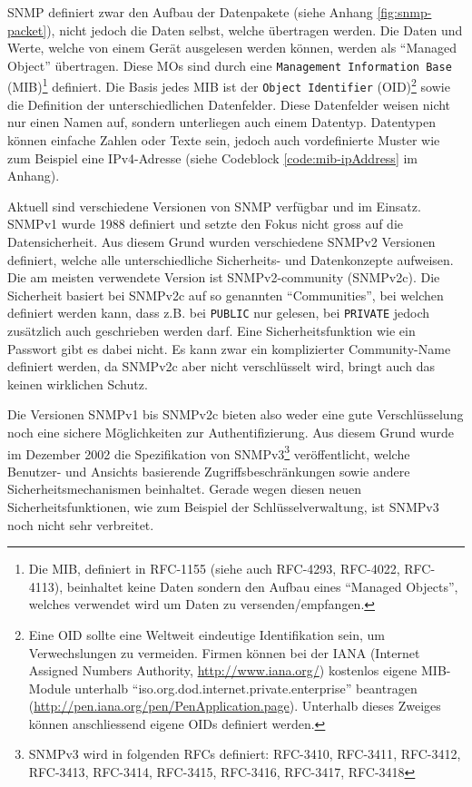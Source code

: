 SNMP definiert zwar den Aufbau der Datenpakete (siehe Anhang \ref{fig:snmp-packet}), nicht jedoch die Daten selbst, welche \"ubertragen werden. Die Daten und Werte, welche von einem Ger\"at ausgelesen werden k\"onnen, werden als "`Managed Object"' \"ubertragen. Diese MOs sind durch eine \texttt{Management Information Base} (MIB)\footnote{\label{foot:snmp-mib}Die MIB, definiert in RFC-1155\cite{rfc1155} (siehe auch RFC-4293\cite{rfc4293}, RFC-4022\cite{rfc4022}, RFC-4113\cite{rfc4113}), beinhaltet keine Daten sondern den Aufbau eines "`Managed Objects"', welches verwendet wird um Daten zu versenden/empfangen.} definiert. Die Basis jedes MIB ist der \texttt{Object Identifier} (OID)\footnote{\label{foot:snmp-oid}Eine OID sollte eine Weltweit eindeutige Identifikation sein, um Verwechslungen zu vermeiden. Firmen k\"onnen bei der IANA (Internet Assigned Numbers Authority, \url{http://www.iana.org/}) kostenlos eigene MIB-Module unterhalb "`iso.org.dod.internet.private.enterprise"' beantragen (\url{http://pen.iana.org/pen/PenApplication.page}). Unterhalb dieses Zweiges k\"onnen anschliessend eigene OIDs definiert werden.} sowie die Definition der unterschiedlichen Datenfelder. Diese Datenfelder weisen nicht nur einen Namen auf, sondern unterliegen auch einem Datentyp. Datentypen k\"onnen einfache Zahlen oder Texte sein, jedoch auch vordefinierte Muster wie zum Beispiel eine IPv4-Adresse (siehe Codeblock \ref{code:mib-ipAddress} im Anhang).

Aktuell sind verschiedene Versionen von SNMP verf\"ugbar und im Einsatz. SNMPv1 wurde 1988 definiert und setzte den Fokus nicht gross auf die Datensicherheit. Aus diesem Grund wurden verschiedene SNMPv2 Versionen definiert, welche alle unterschiedliche Sicherheits- und Datenkonzepte aufweisen. Die am meisten verwendete Version ist SNMPv2-community (SNMPv2c). Die Sicherheit basiert bei SNMPv2c auf so genannten "`Communities"', bei welchen definiert werden kann, dass z.B. bei \texttt{PUBLIC} nur gelesen, bei \texttt{PRIVATE} jedoch zus\"atzlich auch geschrieben werden darf. Eine Sicherheitsfunktion wie ein Passwort gibt es dabei nicht. Es kann zwar ein komplizierter Community-Name definiert werden, da SNMPv2c aber nicht verschl\"usselt wird, bringt auch das keinen wirklichen Schutz.

Die Versionen SNMPv1 bis SNMPv2c bieten also weder eine gute Verschl\"usselung noch eine sichere M\"oglichkeiten zur Authentifizierung. Aus diesem Grund wurde im Dezember 2002 die Spezifikation von SNMPv3\footnote{\label{foot:snmpv3-rfc}SNMPv3 wird in folgenden RFCs definiert: RFC-3410\cite{rfc3410}, RFC-3411\cite{rfc3411}, RFC-3412\cite{rfc3412}, RFC-3413\cite{rfc3413}, RFC-3414\cite{rfc3414}, RFC-3415\cite{rfc3415}, RFC-3416\cite{rfc3416}, RFC-3417\cite{rfc3417}, RFC-3418\cite{rfc3418}} ver\"offentlicht, welche Benutzer- und Ansichts basierende Zugriffsbeschr\"ankungen sowie andere Sicherheitsmechanismen beinhaltet. Gerade wegen diesen neuen Sicherheitsfunktionen, wie zum Beispiel der Schl\"usselverwaltung, ist SNMPv3 noch nicht sehr verbreitet.

